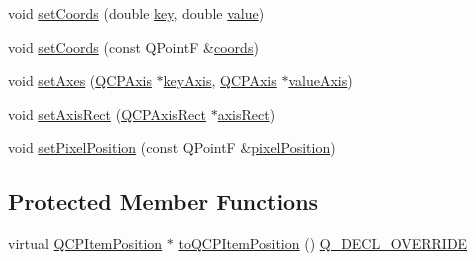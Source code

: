 \begin{DoxyCompactItemize}
void \hyperlink{class_q_c_p_item_position_aa988ba4e87ab684c9021017dcaba945f}{set\+Coords} (double \hyperlink{class_q_c_p_item_position_a6fc519f1b73722a8d0cff7d4d647407e}{key}, double \hyperlink{class_q_c_p_item_position_acfcf86f840a7366a4299bff593d5d636}{value})
\item 
void \hyperlink{class_q_c_p_item_position_acc70b3abc143287f806e5f154e5e07b0}{set\+Coords} (const Q\+PointF \&\hyperlink{class_q_c_p_item_position_aa4ecf5b04c67049c05d37619e090820b}{coords})
\item 
void \hyperlink{class_q_c_p_item_position_a2185f45c75ac8cb9be89daeaaad50e37}{set\+Axes} (\hyperlink{class_q_c_p_axis}{Q\+C\+P\+Axis} $\ast$\hyperlink{class_q_c_p_item_position_a9ad34861fbfd8be8b8270c16f879169c}{key\+Axis}, \hyperlink{class_q_c_p_axis}{Q\+C\+P\+Axis} $\ast$\hyperlink{class_q_c_p_item_position_a356ac94e7e73d88deb7f2841c0d0c734}{value\+Axis})
\item 
void \hyperlink{class_q_c_p_item_position_a0cd9b326fb324710169e92e8ca0041c2}{set\+Axis\+Rect} (\hyperlink{class_q_c_p_axis_rect}{Q\+C\+P\+Axis\+Rect} $\ast$\hyperlink{class_q_c_p_item_position_ae4081cfe7575f922f403c6e3a2ce7891}{axis\+Rect})
\item 
void \hyperlink{class_q_c_p_item_position_a8d4f858f2089973967cf9cb81970ef0a}{set\+Pixel\+Position} (const Q\+PointF \&\hyperlink{class_q_c_p_item_position_a8be9a4787635433edecc75164beb748d}{pixel\+Position})
\end{DoxyCompactItemize}
\subsection*{Protected Member Functions}
\begin{DoxyCompactItemize}
\item 
virtual \hyperlink{class_q_c_p_item_position}{Q\+C\+P\+Item\+Position} $\ast$ \hyperlink{class_q_c_p_item_position_a008ff9ebe645a963671b68bcf7f7a1c0}{to\+Q\+C\+P\+Item\+Position} () \hyperlink{qcustomplot_8h_a42cc5eaeb25b85f8b52d2a4b94c56f55}{Q\+\_\+\+D\+E\+C\+L\+\_\+\+O\+V\+E\+R\+R\+I\+DE}
\end{DoxyCompactItemize}
